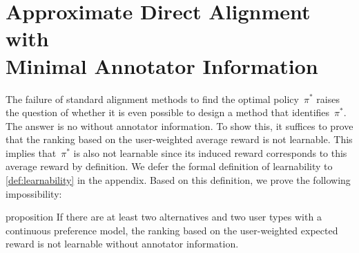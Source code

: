 \section{Approximate Direct Alignment with \ifarxiv \\ \fi Minimal Annotator Information}
\label{sec:dpo_corrected}

The failure of standard alignment methods to find the optimal policy~$\pi^*$ raises the question of whether it is even possible to design a method that identifies~$\pi^*$. The answer is no without annotator information. To show this, it suffices to prove that the ranking based on the user-weighted average reward is not learnable. This implies that~$\pi^*$ is also not learnable since its induced reward corresponds to this average reward by definition. We defer the formal definition of learnability to \cref{def:learnability} in the appendix. Based on this definition, we prove the following impossibility:
\begin{theoremEnd}[restate]{proposition}
\label{prop:impossible_anonymous_learning}
If there are at least two alternatives and two user types with a continuous preference model, the ranking based on the user-weighted expected reward is not learnable without annotator information.
\end{theoremEnd}
